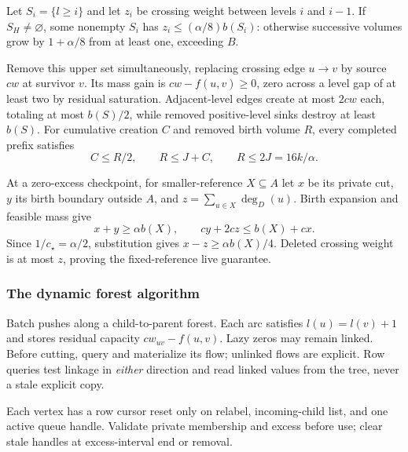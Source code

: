 \documentclass[11pt]{article}
\theoremstyle{remark}
\begin{document}
Let $S_i=\{l\ge i\}$ and let $z_i$ be crossing weight between levels $i$ and
$i-1$.
If $S_H\ne\varnothing$, some nonempty $S_i$ has $z_i\le(\alpha/8)b(S_i)$:
otherwise successive volumes grow by $1+\alpha/8$ from at least one, exceeding
$B$.

Remove this upper set simultaneously, replacing crossing edge $u\to v$ by source
$cw$ at survivor $v$.
Its mass gain is $cw-f(u,v)\ge0$, zero across a level gap of at least two by
residual saturation.
Adjacent-level edges create at most $2cw$ each, totaling at most $b(S)/2$, while
removed positive-level sinks destroy at least $b(S)$.
For cumulative creation $C$ and removed birth volume $R$, every completed prefix
satisfies
\begin{equation}\label{struct27:eq:massbudget}
 C\le R/2,\qquad R\le J+C,\qquad R\le2J=16k/\alpha.
\end{equation}

At a zero-excess checkpoint, for smaller-reference $X\subseteq A$ let $x$ be its
private cut, $y$ its birth boundary outside $A$, and $z=\sum_{u\in X}\deg_D(u)$.
Birth expansion and feasible mass give
\[
 x+y\ge\alpha b(X),\qquad cy+2cz\le b(X)+cx.
\]
Since $1/c_\star=\alpha/2$, substitution gives $x-z\ge\alpha b(X)/4$.
Deleted crossing weight is at most $z$, proving the fixed-reference live
guarantee.

\subsubsection{The dynamic forest algorithm} Batch pushes along a
child-to-parent forest.
Each arc satisfies $l(u)=l(v)+1$ and stores residual capacity $cw_{uv}-f(u,v)$.
Lazy zeros may remain linked.
Before cutting, query and materialize its flow; unlinked flows are explicit.
Row queries test linkage in \emph{either} direction and read linked values from
the tree, never a stale explicit copy.

Each vertex has a row cursor reset only on relabel, incoming-child list, and one
active queue handle.
Validate private membership and excess before use; clear stale handles at
excess-interval end or removal.
\end{document}
